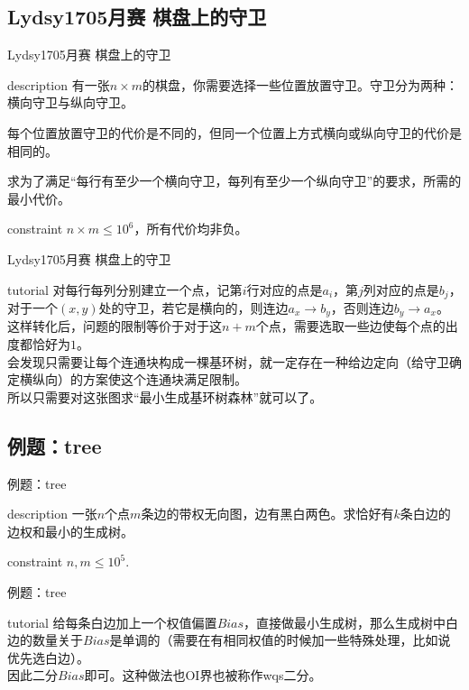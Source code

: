 \documentclass{beamer}
\begin{document}
\subsection{Lydsy1705月赛 棋盘上的守卫}
\begin{frame}{Lydsy1705月赛 棋盘上的守卫}
	\begin{block}{description}
		有一张$n \times m$的棋盘，你需要选择一些位置放置守卫。守卫分为两种：横向守卫与纵向守卫。
		
		每个位置放置守卫的代价是不同的，但同一个位置上方式横向或纵向守卫的代价是相同的。
		
		求为了满足“每行有至少一个横向守卫，每列有至少一个纵向守卫”的要求，所需的最小代价。
	\end{block}
	\begin{block}{constraint}
		$n \times m \le 10^6$，所有代价均非负。
	\end{block}
\end{frame}
\begin{frame}{Lydsy1705月赛 棋盘上的守卫}
	\begin{block}{tutorial}
		对每行每列分别建立一个点，记第$i$行对应的点是$a_i$，第$j$列对应的点是$b_j$，对于一个$(x, y)$处的守卫，若它是横向的，则连边$a_x \to b_y$，否则连边$b_y \to a_x$。\\
		
		这样转化后，问题的限制等价于对于这$n + m$个点，需要选取一些边使每个点的出度都恰好为$1$。\\
		
		会发现只需要让每个连通块构成一棵基环树，就一定存在一种给边定向（给守卫确定横纵向）的方案使这个连通块满足限制。\\
		
		所以只需要对这张图求“最小生成基环树森林”就可以了。
	\end{block}
\end{frame}


\subsection{例题：tree}
\begin{frame}{例题：tree}
	\begin{block}{description}
		一张$n$个点$m$条边的带权无向图，边有黑白两色。求恰好有$k$条白边的边权和最小的生成树。
	\end{block}
	\begin{block}{constraint}
		$n, m \le 10^5.$
	\end{block}
\end{frame}
\begin{frame}{例题：tree}
	\begin{block}{tutorial}
		给每条白边加上一个权值偏置$Bias$，直接做最小生成树，那么生成树中白边的数量关于$Bias$是单调的（需要在有相同权值的时候加一些特殊处理，比如说优先选白边）。\\
		
		因此二分$Bias$即可。这种做法也OI界也被称作wqs二分。
	\end{block}
\end{frame}
\end{document}
